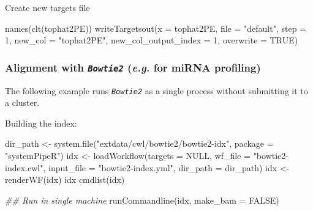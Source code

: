 \documentclass[14pt,]{article}
\newcommand{\hlnum}[1]{\textcolor[rgb]{0.816,0.125,0.439}{#1}}%
\newcommand{\hlstr}[1]{\textcolor[rgb]{0.251,0.627,0.251}{#1}}%
\newcommand{\hlcom}[1]{\textcolor[rgb]{0.502,0.502,0.502}{\textit{#1}}}%
\newcommand{\hlstd}[1]{\textcolor[rgb]{0.251,0.251,0.251}{#1}}%
\newenvironment{Shaded}{\begin{myshaded}}{\end{myshaded}}
\newcommand{\DecValTok}[1]{\hlnum{#1}}
\newcommand{\ConstantTok}[1]{\hlnum{#1}}
\newcommand{\StringTok}[1]{\hlstr{#1}}
\newcommand{\DocumentationTok}[1]{\hlcom{#1}}
\newcommand{\OtherTok}[1]{{#1}}
\newcommand{\FunctionTok}[1]{\hlstd{#1}}
\newcommand{\AttributeTok}[1]{{#1}}
\newcommand{\NormalTok}[1]{\hlstd{#1}}
\begin{document}
Create new targets file

\begin{Shaded}
\begin{Highlighting}[]
\FunctionTok{names}\NormalTok{(}\FunctionTok{clt}\NormalTok{(tophat2PE))}
\FunctionTok{writeTargetsout}\NormalTok{(}\AttributeTok{x =}\NormalTok{ tophat2PE, }\AttributeTok{file =} \StringTok{"default"}\NormalTok{, }\AttributeTok{step =} \DecValTok{1}\NormalTok{, }\AttributeTok{new\_col =} \StringTok{"tophat2PE"}\NormalTok{, }
    \AttributeTok{new\_col\_output\_index =} \DecValTok{1}\NormalTok{, }\AttributeTok{overwrite =} \ConstantTok{TRUE}\NormalTok{)}
\end{Highlighting}
\end{Shaded}

\hypertarget{alignment-with-bowtie2-e.g.-for-mirna-profiling}{%
\subsubsection{\texorpdfstring{Alignment with \emph{\texttt{Bowtie2}} (\emph{e.g.} for miRNA profiling)}{Alignment with Bowtie2 (e.g. for miRNA profiling)}}\label{alignment-with-bowtie2-e.g.-for-mirna-profiling}}

The following example runs \emph{\texttt{Bowtie2}} as a single process without submitting it to a cluster.

Building the index:

\begin{Shaded}
\begin{Highlighting}[]
\NormalTok{dir\_path }\OtherTok{\textless{}{-}} \FunctionTok{system.file}\NormalTok{(}\StringTok{"extdata/cwl/bowtie2/bowtie2{-}idx"}\NormalTok{, }\AttributeTok{package =} \StringTok{"systemPipeR"}\NormalTok{)}
\NormalTok{idx }\OtherTok{\textless{}{-}} \FunctionTok{loadWorkflow}\NormalTok{(}\AttributeTok{targets =} \ConstantTok{NULL}\NormalTok{, }\AttributeTok{wf\_file =} \StringTok{"bowtie2{-}index.cwl"}\NormalTok{, }\AttributeTok{input\_file =} \StringTok{"bowtie2{-}index.yml"}\NormalTok{, }
    \AttributeTok{dir\_path =}\NormalTok{ dir\_path)}
\NormalTok{idx }\OtherTok{\textless{}{-}} \FunctionTok{renderWF}\NormalTok{(idx)}
\NormalTok{idx}
\FunctionTok{cmdlist}\NormalTok{(idx)}

\DocumentationTok{\#\# Run in single machine}
\FunctionTok{runCommandline}\NormalTok{(idx, }\AttributeTok{make\_bam =} \ConstantTok{FALSE}\NormalTok{)}
\end{Highlighting}
\end{Shaded}
\end{document}
